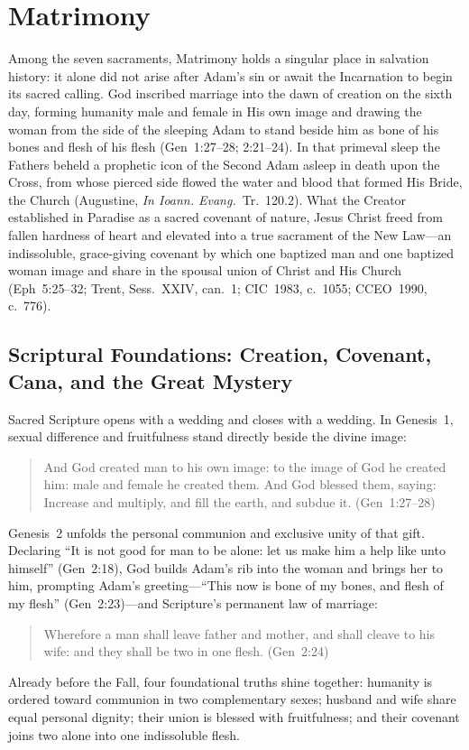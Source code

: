 \section{Matrimony}
\label{sec:matrimony}

Among the seven sacraments, Matrimony holds a singular place in salvation history: it alone did not arise after Adam's sin or await the Incarnation to begin its sacred calling. God inscribed marriage into the dawn of creation on the sixth day, forming humanity male and female in His own image and drawing the woman from the side of the sleeping Adam to stand beside him as bone of his bones and flesh of his flesh (Gen~1:27--28; 2:21--24). In that primeval sleep the Fathers beheld a prophetic icon of the Second Adam asleep in death upon the Cross, from whose pierced side flowed the water and blood that formed His Bride, the Church (Augustine, \emph{In Ioann. Evang.}~Tr.~120.2). What the Creator established in Paradise as a sacred covenant of nature, Jesus Christ freed from fallen hardness of heart and elevated into a true sacrament of the New Law---an indissoluble, grace-giving covenant by which one baptized man and one baptized woman image and share in the spousal union of Christ and His Church (Eph~5:25--32; Trent, Sess.~XXIV, can.~1; CIC~1983, c.~1055; CCEO~1990, c.~776).

\subsection{Scriptural Foundations: Creation, Covenant, Cana, and the Great Mystery}
\label{subsec:matrimony-scripture}

Sacred Scripture opens with a wedding and closes with a wedding. In Genesis~1, sexual difference and fruitfulness stand directly beside the divine image:
\begin{quotation}
And God created man to his own image: to the image of God he created him: male and female he created them. And God blessed them, saying: Increase and multiply, and fill the earth, and subdue it. (Gen~1:27--28)
\end{quotation}
Genesis~2 unfolds the personal communion and exclusive unity of that gift. Declaring ``It is not good for man to be alone: let us make him a help like unto himself'' (Gen~2:18), God builds Adam's rib into the woman and brings her to him, prompting Adam's greeting---``This now is bone of my bones, and flesh of my flesh'' (Gen~2:23)---and Scripture's permanent law of marriage:
\begin{quotation}
Wherefore a man shall leave father and mother, and shall cleave to his wife: and they shall be two in one flesh. (Gen~2:24)
\end{quotation}
Already before the Fall, four foundational truths shine together: humanity is ordered toward communion in two complementary sexes; husband and wife share equal personal dignity; their union is blessed with fruitfulness; and their covenant joins two alone into one indissoluble flesh.

